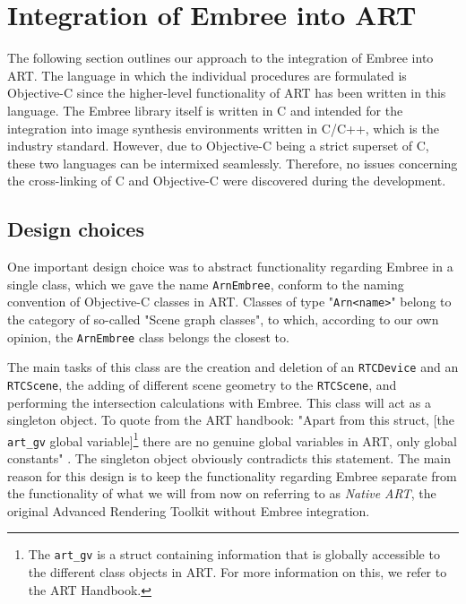 \chapter{Integration of Embree into ART}
\label{chap:integration}

The following section outlines our approach to the integration of Embree into ART. The language in which the individual procedures are formulated is Objective-C since the higher-level functionality of ART has been written in this language. The Embree library itself is written in C and intended for the integration into image synthesis environments written in C/C++, which is the industry standard. However, due to Objective-C being a strict superset of C, these two languages can be intermixed seamlessly. Therefore, no issues concerning the cross-linking of C and Objective-C were discovered during the development.

\section{Design choices}

One important design choice was to abstract functionality regarding Embree in a single class, which we gave the name \texttt{ArnEmbree}, conform to the naming convention of Objective-C classes in ART. Classes of type "\texttt{Arn<name>}" belong to the category of so-called "Scene graph classes", to which, according to our own opinion, the \texttt{ArnEmbree} class belongs the closest to.

The main tasks of this class are the creation and deletion of an \texttt{RTCDevice} and an \texttt{RTCScene}, the adding of different scene geometry to the \texttt{RTCScene}, and performing the intersection calculations with Embree. This class will act as a singleton object. To quote from the ART handbook: "Apart from this struct, [the \texttt{art\_gv} global variable]\footnote{The \texttt{art\_gv} is a struct containing information that is globally accessible to the different class objects in ART. For more information on this, we refer to the ART Handbook.} there are no genuine global variables in ART, only global constants" \cite[Chapter 4.1.2]{arthandbook}. The singleton object obviously contradicts this statement. The main reason for this design is to keep the functionality regarding Embree separate from the functionality of what we will from now on referring to as \emph{Native ART}, the original Advanced Rendering Toolkit without Embree integration.

